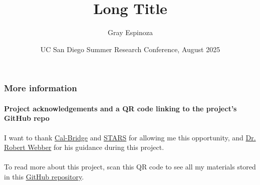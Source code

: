\documentclass[aspectratio=43]{beamer}
\title[Short Title]{Long Title}
\author{Gray Espinoza}
\institute{California State University,\\Fullerton}
\date[13 August 2025]{UC San Diego Summer Research Conference, August 2025}
\begin{document}
\begin{frame}[plain]
  \titlepage
\end{frame}

\begin{frame}
  \frametitle{More information}
  \framesubtitle{Project acknowledgements and a QR code linking to
  the project's GitHub repo}

  I want to thank \href{https://calbridge.org}{Cal-Bridge} and
  \href{https://grad.ucsd.edu/oar2/oar2office/programs/undergraduate-programs/stars}{STARS}
  for allowing me this opportunity, and
  \href{https://sites.google.com/ucsd.edu/rwebber}{Dr. Robert Webber}
  for his guidance during this project.
  \\~\\

  To read more about this project, scan this QR code to see all my
  materials stored in this
  \href{https://github.com/grayespinoza/cbsp25}{GitHub repository}.
  \\~\\

  \begin{center}
  \end{center}
\end{frame}
\end{document}

